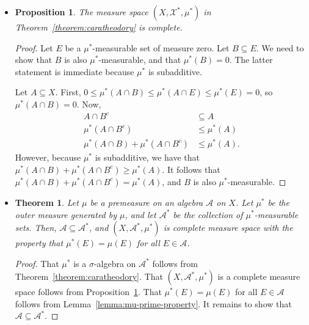 \documentclass[10pt]{article}
\newtheorem{theorem}[lemma]{Theorem}
\newtheorem{proposition}[lemma]{Proposition}
\newcommand{\mcal}[1]{\mathcal{#1}}
\begin{document}
\begin{itemize}
  \item \begin{proposition} \label{proposition:caratheodory-completeness}
    The measure space $(X, \mcal{X}^*, \mu^*)$ in Theorem~\ref{theorem:caratheodory} is complete.
  \end{proposition}

  \begin{proof}
    Let $E$ be a $\mu^*$-measurable set of measure zero. Let $B \subseteq E$. We need to show that $B$ is also $\mu^*$-measurable, and that $\mu^*(B) = 0$. The latter statement is immediate because $\mu^*$ is subadditive.

    Let $A \subseteq X$. First, $0 \leq \mu^*(A \cap B) \leq \mu^*(A \cap E) \leq \mu^*(E) = 0$, so $\mu^*(A \cap B) = 0$. Now,
    \begin{align*}
      A \cap B^c &\subseteq A \\
      \mu^*(A \cap B^c) &\leq \mu^*(A) \\
      \mu^*(A \cap B) + \mu^*(A \cap B^c) &\leq \mu^*(A).
    \end{align*}
    However, because $\mu^*$ is subadditive, we have that $\mu^*(A \cap B) + \mu^*(A \cap B^c) \geq \mu^*(A)$. It follows that $\mu^*(A \cap B) + \mu^*(A \cap B^c) = \mu^*(A)$, and $B$ is also $\mu^*$-measurable.
  \end{proof}

  \item \begin{theorem} \label{theorem:premeasure-to-measure}
  Let $\mu$ be a premeasure on an algebra $\mcal{A}$ on $X$. Let $\mu^*$ be the outer measure generated by $\mu$, and let $\mcal{A}^*$ be the collection of $\mu^*$-measurable sets. Then, $\mcal{A} \subseteq \mcal{A}^*$, and $(X,\mcal{A}^*,\mu^*)$ is complete measure space with the property that $\mu^*(E) = \mu(E)$ for all $E \in \mcal{A}$.
  \end{theorem}

  \begin{proof}
    That $\mu^*$ is a $\sigma$-algebra on $\mcal{A}^*$ follows from Theorem~\ref{theorem:caratheodory}. That $(X, \mcal{A}^*, \mu^*)$ is a complete measure space follows from Proposition~\ref{proposition:caratheodory-completeness}. That $\mu^*(E) = \mu(E)$ for all $E \in \mcal{A}$ follows from Lemma~\ref{lemma:mu-prime-property}. It remains to show that $\mcal{A} \subseteq \mcal{A}^*$.


\end{proof}
\end{itemize}
\end{document}
